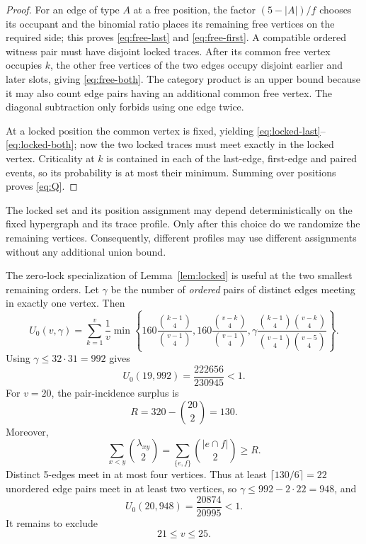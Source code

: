 \documentclass[11pt]{article}
\theoremstyle{remark}
\begin{document}
\begin{proof}
For an edge of type $A$ at a free position, the factor $(5-|A|)/f$
chooses its occupant and the binomial ratio places its remaining free
vertices on the required side; this proves \eqref{eq:free-last} and
\eqref{eq:free-first}.  A compatible ordered witness pair must have disjoint
locked traces.  After its common free vertex occupies $k$, the other free
vertices of the two edges occupy disjoint earlier and later slots, giving
\eqref{eq:free-both}.  The category product is an upper bound because it may
also count edge pairs having an additional common free vertex.  The diagonal
subtraction only forbids using one edge twice.

At a locked position the common vertex is fixed, yielding
\eqref{eq:locked-last}--\eqref{eq:locked-both}; now the two locked traces
must meet exactly in the locked vertex.  Criticality at $k$ is contained in
each of the last-edge, first-edge and paired events, so its probability is
at most their minimum.  Summing over positions proves \eqref{eq:Q}.
\end{proof}

The locked set and its position assignment may depend deterministically on
the fixed hypergraph and its trace profile.  Only after this choice do we
randomize the remaining vertices.  Consequently, different profiles may
use different assignments without any additional union bound.

The zero-lock specialization of Lemma~\ref{lem:locked} is useful at the two
smallest remaining orders.  Let $\gamma$ be the number of \emph{ordered}
pairs of distinct edges meeting in exactly one vertex.  Then
\begin{equation}\label{eq:zero-lock}
U_0(v,\gamma)=\sum_{k=1}^{v}\frac1v\min\!\left\{
160\frac{\binom{k-1}4}{\binom{v-1}4},
160\frac{\binom{v-k}4}{\binom{v-1}4},
\gamma\frac{\binom{k-1}4\binom{v-k}4}
{\binom{v-1}4\binom{v-5}4}
\right\}.
\end{equation}
Using $\gamma\le32\cdot31=992$ gives
\[
U_0(19,992)=\frac{222656}{230945}<1.
\]
For $v=20$, the pair-incidence surplus is
\[
R=320-\binom{20}{2}=130.
\]
Moreover,
\[
\sum_{x<y}\binom{\lambda_{xy}}2
=\sum_{\{e,f\}}\binom{|e\cap f|}{2}\ge R.
\]
Distinct 5-edges meet in at most four vertices.  Thus at least
$\lceil130/6\rceil=22$ unordered edge pairs meet in at least two vertices,
so $\gamma\le992-2\cdot22=948$, and
\[
U_0(20,948)=\frac{20874}{20995}<1.
\]
It remains to exclude
\begin{equation}\label{eq:remaining-v}
21\le v\le25.
\end{equation}
\end{document}
